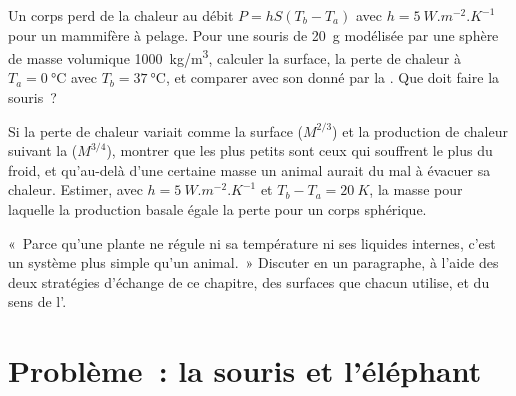 \begin{exercise}[$\star\star\star$]\label{exo:b1:organism-environment:10}
Un corps perd de la chaleur au débit $P = hS(T_b - T_a)$ avec
$h = \qty{5}{W.m^{-2}.K^{-1}}$ pour un mammifère à pelage. Pour une
souris de \qty{20}{g} modélisée par une sphère de masse volumique
\qty{1000}{kg/m^3}, calculer la surface, la perte de chaleur à
$T_a = \qty{0}{\celsius}$ avec $T_b =
\qty{37}{\celsius}$, et comparer avec son  donné par la
. Que doit faire la souris~?
\end{exercise}

\begin{exercise}[$\star\star\star$]\label{exo:b1:organism-environment:11}
Si la perte de chaleur variait comme la surface ($M^{2/3}$) et la
production de chaleur suivant la  ($M^{3/4}$), montrer que
les plus petits  sont ceux qui souffrent le plus du froid, et
qu'au-delà d'une certaine masse un animal aurait du mal à évacuer sa
chaleur. Estimer, avec $h = \qty{5}{W.m^{-2}.K^{-1}}$ et
$T_b - T_a = \qty{20}{K}$, la masse pour laquelle la production basale
égale la perte pour un corps sphérique.
\end{exercise}

\begin{exercise}[$\star\star\star$]\label{exo:b1:organism-environment:12}
«~Parce qu'une plante ne régule ni sa température ni ses liquides
internes, c'est un système plus simple qu'un animal.~» Discuter en un
paragraphe, à l'aide des deux stratégies d'échange de ce chapitre, des
surfaces que chacun utilise, et du sens de l'.
\end{exercise}

\section{Problème~: la souris et l'éléphant}

